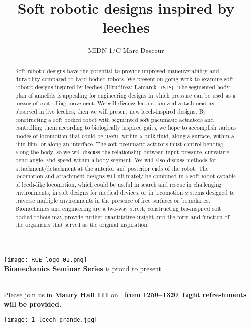 \documentclass{article}
\author{MIDN 1/C Marc Descour}
\title{Soft robotic designs inspired by leeches}
\date{\printdate{2/21/2019}}
\begin{document}
\thispagestyle{empty}
\makeatletter
\vfill
\begin{center}
\texttt{[image: RCE-logo-01.png]}\\
\textbf{Biomechanics Seminar Series} is proud to present\\
\vspace{1em}
\textbf{\Large\@author}\\
\vspace{1em}
\textbf{\Large\@title}
\end{center}
\makeatother

\begin{abstract}
Soft robotic designs have the potential to provide improved maneuverability and durability compared to hard-bodied robots. We present on-going work to examine soft robotic designs inspired by leeches (Hirudinea: Lamarck, 1818). The segmented body plan of annelids is appealing for engineering designs in which pressure can be used as a means of controlling movement. We will discuss locomotion and attachment as observed in live leeches, then we will present new leech-inspired designs. By constructing a soft bodied robot with segmented soft pneumatic actuators and controlling them according to biologically inspired gaits, we hope to accomplish various modes of locomotion that could be useful within a bulk fluid, along a surface, within a thin film, or along an interface. The soft pneumatic actutors must control bending along the body, so we will discuss the relationship between input pressure, curvature, bend angle, and speed within a body segment. We will also discuss methods for attachment/detachment at the anterior and posterior ends of the robot. The locomotion and attachment designs will ultimately be combined in a soft robot capable of leech-like locomotion, which could be useful in search and rescue in challenging environments, in soft designs for medical devices, or in locomotion systems designed to traverse multiple environments in the presence of free surfaces or boundaries. Biomechanics and engineering are a two-way street; constructing bio-inspired soft bodied robots may provide further quantitative insight into the form and function of the organisms that served as the original inspiration. 

\end{abstract}

\makeatletter
Please join us in \textbf{Maury Hall 111} on \textbf{\@date\ from 1250--1320}. \textbf{Light refreshments will be provided.}
\makeatother
\vfill

\begin{center}
\texttt{[image: 1-leech\_grande.jpg]}
\end{center}
\vfill
\end{document}
